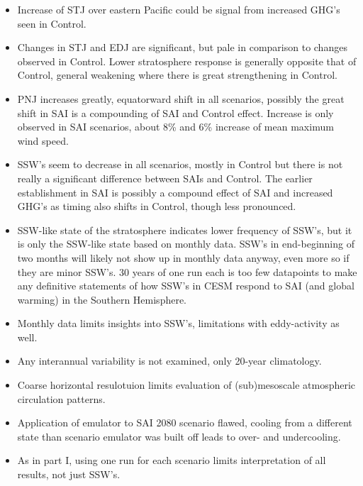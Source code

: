 \begin{itemize}
    \item Increase of STJ over eastern Pacific could be signal from increased GHG's seen in Control.
    \item Changes in STJ and EDJ are significant, but pale in comparison to changes observed in Control. Lower stratosphere response is generally opposite that of Control, general weakening where there is great strengthening in Control.
    \item PNJ increases greatly, equatorward shift in all scenarios, possibly the great shift in SAI is a compounding of SAI and Control effect. Increase is only observed in SAI scenarios, about 8\% and 6\% increase of mean maximum wind speed.
    \item SSW's seem to decrease in all scenarios, mostly in Control but there is not really a significant difference between SAIs and Control. The earlier establishment in SAI is possibly a compound effect of SAI and increased GHG's as timing also shifts in Control, though less pronounced.
    \item SSW-like state of the stratosphere indicates lower frequency of SSW's, but it is only the SSW-like state based on monthly data. SSW's in end-beginning of two months will likely not show up in monthly data anyway, even more so if they are minor SSW's. 30 years of one run each is too few datapoints to make any definitive statements of how SSW's in CESM respond to SAI (and global warming) in the Southern Hemisphere. 
    \item Monthly data limits insights into SSW's, limitations with eddy-activity as well.
    \item Any interannual variability is not examined, only 20-year climatology.
    \item Coarse horizontal resulotuion limits evaluation of (sub)mesoscale atmospheric circulation patterns.
    \item Application of emulator to SAI 2080 scenario flawed, cooling from a different state than scenario emulator was built off leads to over- and undercooling.
    \item As in part I, using one run for each scenario limits interpretation of all results, not just SSW's.
\end{itemize}
